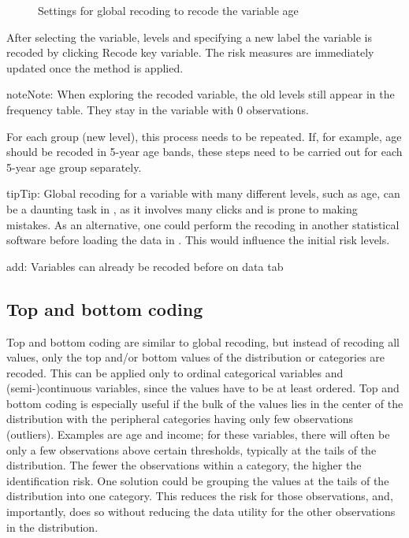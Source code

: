 \documentclass[letterpaper,10pt,english]{sphinxmanual}
\begin{document}
\begin{figure}[htbp]
\centering
\capstart

\noindent{}
\caption{Settings for global recoding to recode the variable age}\label{\detokenize{anon:fig81}}\label{\detokenize{anon:id1}}\end{figure}

After selecting the variable, levels and specifying a new label the variable is recoded
by clicking Recode key variable. The risk measures are immediately updated once the method
is applied.

\begin{sphinxadmonition}{note}{Note:}
When exploring the recoded variable, the old levels still appear in the
frequency table. They stay in the variable with 0 observations.
\end{sphinxadmonition}

For each group (new level), this process needs to be repeated. If, for example, age should
be recoded in 5-year age bands, these steps need to be carried out for each 5-year
age group separately.

\begin{sphinxadmonition}{tip}{Tip:}
Global recoding for a variable with many different levels, such as age, can be a
daunting task in , as it involves many clicks and is prone to making mistakes.
As an alternative, one could perform the recoding in another statistical software
before loading the data in . This would influence the initial risk levels.
\end{sphinxadmonition}

add: Variables can already be recoded before on data tab


\subsection{Top and bottom coding}
\label{\detokenize{anon:top-and-bottom-coding}}
Top and bottom coding are similar to global recoding, but instead of recoding all values,
only the top and/or bottom values of the distribution or categories are recoded. This can
be applied only to ordinal categorical variables and (semi-)continuous variables, since
the values have to be at least ordered. Top and bottom coding is especially useful if
the bulk of the values lies in the center of the distribution with the peripheral
categories having only few observations (outliers). Examples are age and income; for
these variables, there will often be only a few observations above certain thresholds,
typically at the tails of the distribution. The fewer the observations within a category,
the higher the identification risk. One solution could be grouping the values at the tails
of the distribution into one category. This reduces the risk for those observations, and,
importantly, does so without reducing the data utility for the other observations in the
distribution.
\end{document}
